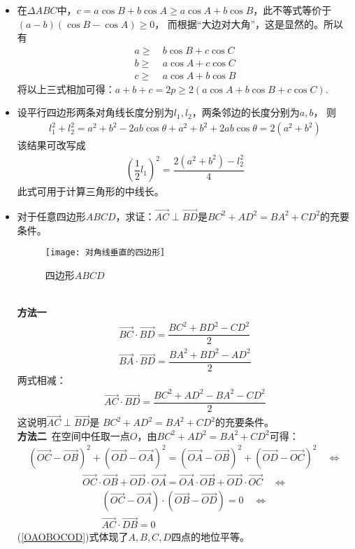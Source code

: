 \begin{itemize}[leftmargin=\inteval{\myitemleftmargin}pt,itemsep=
   \inteval{\myitemitempsep}pt,topsep=\inteval{\myitemtopsep}pt]
\item 在$ \Delta ABC $中，$ c=a\cos B+b\cos A\geq a\cos A+
b\cos B $，此不等式等价于\\ $ (a-b)(\cos B-\cos A)\geq 0 $，
而根据“大边对大角”，这是显然的。所以有
\begin{align*}
    a \geq &\ b\cos B+ c\cos C  \\
    b \geq &\ a\cos A+ c\cos C  \\
    c \geq &\ a\cos A+ b\cos B  	
\end{align*}
将以上三式相加可得：$ a+b+c=2p \geq 2(a\cos A+b\cos B+ c\cos C) $. 

\item 设平行四边形两条对角线长度分别为$ l_1,l_2 $，两条邻边的长度分别为$ a,b $，
则
\begin{gather*}
    l_1^2+l_2^2=a^2+b^2-2ab\cos\theta+a^2+b^2+2ab\cos\theta=2(a^2+b^2)
\end{gather*}
该结果可改写成
\begin{gather*}
    \left(\dfrac{1}{2}l_1\right)^2=\dfrac{2(a^2+b^2)-l_2^2}{4}
\end{gather*}
此式可用于计算三角形的中线长。 

\item 对于任意四边形$ ABCD $，求证：$ \vec{AC}\perp
\vec{BD} $是$ BC^2+AD^2=BA^2+CD^2 $的充要条件。
\begin{figure}[h]
    \centering
    \texttt{[image: 对角线垂直的四边形]}
    \caption{四边形$ ABCD $}
    \label{图8-1四边形ABCD}
\end{figure} \\
\textbf{方法一}
\begin{align*}
    \vec{BC}\cdot\vec{BD}=\dfrac{BC^2+BD^2-CD^2}{2} \\
    \vec{BA}\cdot\vec{BD}=\dfrac{BA^2+BD^2-AD^2}{2} 
\end{align*}
两式相减：
\begin{align*}
    \vec{AC}\cdot\vec{BD}=\dfrac{BC^2+AD^2-BA^2-CD^2}{2}
\end{align*}
这说明$ \vec{AC}\perp \vec{BD} $是
$ BC^2+AD^2=BA^2+CD^2 $的充要条件。 \\
\textbf{方法二}\ 在空间中任取一点$ O $，由$ BC^2+AD^2=BA^2+CD^2 $可得：
\begin{gather*}
    (\vec{OC}-\vec{OB})^2 +
    (\vec{OD}-\vec{OA})^2 =
    (\vec{OA}-\vec{OB})^2 +
    (\vec{OD}-\vec{OC})^2  \quad \Leftrightarrow 	
\end{gather*}
\vspace{-0.8cm}
\begin{gather}\label{OAOBOCOD}
    \vec{OC}\cdot\vec{OB}+
    \vec{OD}\cdot\vec{OA}=
    \vec{OA}\cdot\vec{OB}+
    \vec{OD}\cdot\vec{OC} \quad \Leftrightarrow
\end{gather}
\vspace{-0.8cm}
\begin{gather*}	 
    (\vec{OC}-\vec{OA})
    \cdot(\vec{OB}-\vec{OD})=0 \quad \Leftrightarrow \\
    \vec{AC}\cdot\vec{DB}=0
\end{gather*}
(\ref{OAOBOCOD})式体现了$ A,B,C,D $四点的地位平等。


\end{itemize}
